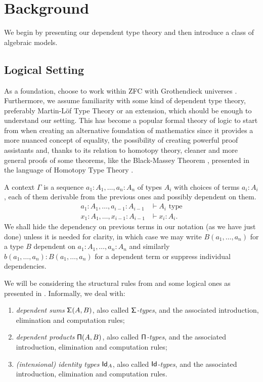 \chapter{Background}\label{chapter1}

We begin by presenting our dependent type theory and then introduce a class of
algebraic models.

\section{Logical Setting}

As a foundation, choose to work within ZFC with Grothendieck universes
\cite{Jec13}.
Furthermore, we assume familiarity with some kind of dependent type theory,
preferably Martin-L\"{o}f Type Theory \cite{ML84} or an extension, which
should be enough to understand our setting. This has become a popular formal
theory of logic to start from when creating an alternative foundation of
mathematics since it provides a more nuanced concept of equality, the
possibility of creating powerful proof assistants and, thanks to its relation to
homotopy theory, cleaner and more general proofs of some theorems, like the
Black-Massey Theorem \cite{HFLL16}, presented in the language of Homotopy Type
Theory \cite{Uni13}.

\begin{notation}
  A context $\Gamma$ is a sequence $a_1:A_1,\ldots,a_n:A_n$ of types $A_i$ with
  choices of terms
  $a_i:A_i$, each of them derivable from the previous ones and possibly
  dependent on them.
  \begin{align*}
    a_1:A_1,\ldots,a_{i-1}:A_{i-1} &\vdash A_i \text{ type} \\
    x_1:A_1,\ldots,x_{i-1}:A_{i-1} &\vdash x_i:A_i.
  \end{align*}
  We shall hide the
  dependency on previous terms in our notation (as we have just done) unless
  it is needed for clarity, in which case we
  may write $B(a_1,\ldots,a_n)$ for a type $B$ dependent on
  $a_1:A_1,\ldots,a_n:A_n$ and similarly $b(a_1,\ldots,a_n):B(a_1,\ldots,a_n)$
  for a dependent term or suppress individual dependencies.
\end{notation}

\noindent
We will be considering the structural rules from \cite[App.\ A.1]{KL12} and some
logical ones as presented in \cite[App.\ A.2]{KL12}. Informally, we deal with:
\begin{enumerate}
  \item \emph{dependent sums} $\operatorname{\mathsf{\Sigma}}(A,B)$, also called
    \emph{$\operatorname{\mathsf{\Sigma}}$-types}, and the associated introduction, elimination and
    computation rules;
  \item \emph{dependent products} $\operatorname{\mathsf{\Pi}}(A,B)$, also called \emph{$\operatorname{\mathsf{\Pi}}$-types},
    and the associated introduction, elimination and computation rules;
  \item \emph{(intensional) identity types} $\operatorname{\mathsf{Id}}_A$, also called
    \emph{$\operatorname{\mathsf{Id}}$-types}, and the associated introduction, elimination and
    computation rules.
\end{enumerate}

